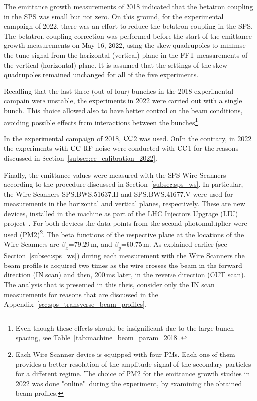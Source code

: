 The emittance growth measurements of 2018 indicated that the betatron coupling in the SPS was small but not zero. On this ground, for the experimental campaign of 2022, there was an effort to reduce the betatron coupling in the SPS. The betatron coupling correction was performed before the start of the emittance growth measurements on May 16, 2022, using the skew quadrupoles to minimse the tune signal from the horizontal (vertical) plane in the FFT measurements of the vertical (horizontal) plane. It is assumed that the settings of the skew quadrupoles remained unchanged for all of the five experiments.

Recalling that the last three (out of four) bunches in the 2018 experimental campain were unstable, the experiments in 2022 were carried out with a single bunch. This choice allowed also to have better control on the beam conditions, avoiding possible effects from interactions between the bunches\footnote{Even though these effects should be insignificant due to the large bunch spacing, see Table~\ref{tab:machine_beam_param_2018}.}.

In the experimental campaign of 2018, ${\mathrm{CC}}$2 was used. OnIn the contrary, in 2022 the experiments with  ${\mathrm{CC}}$ RF noise were conducted with ${\mathrm{CC}}$1 for the reasons discussed in Section~\ref{subsec:cc_calibration_2022}.

Finally, the emittance values were measured with the SPS Wire Scanners according to the procedure discussed in Section~\ref{subsec:sps_ws}. In particular, the Wire Scanners SPS.BWS.51637.H and SPS.BWS.41677.V were used for measurements in the horizontal and vertical planes, respectively. These are new devices, installed in the machine as part of the LHC Injectors Upgrage (LIU) project~\cite{Shaposhnikova:2016cix}. For both devices the data points from the second photomultiplier were used (PM2)\footnote{Each Wire Scanner device is equipped with four PMs. Each one of them provides a better resolution of the amplitude signal of the secondary particles for a different regime. The choice of PM2 for the emittance growth studies in 2022 was done "online", during the experiment, by examining the obtained beam profiles.}. The beta functions of the respective plane at the locations of the Wire Scanners are $\beta_x$=79.29\,m, and $\beta_y$=60.75\,m. 
As explained earlier (see Section~\ref{subsec:sps_ws}) during each measurement with the Wire Scanners the beam profile is acquired two times as the wire crosses the beam in the forward direction (IN scan) and then, 200\,ms later, in the reverse direction (OUT scan). The analysis that is presented in this theis, consider only the IN scan measurements for reasons that are discussed in the Appendix~\ref{sec:sps_transverse_beam_profiles}. 



